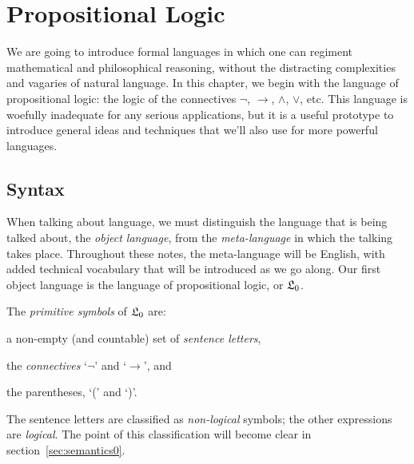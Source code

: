 \chapter{Propositional Logic}\label{ch:propcal}


We are going to introduce formal languages
in which one can regiment mathematical and philosophical reasoning,
without the distracting complexities and vagaries of natural language.
In this chapter,
we begin with the language of propositional logic:
the logic of the connectives $\neg$, $\to$, $\land$, $\lor$, etc.
This language is woefully inadequate for any serious applications,
but it is a useful prototype to introduce general ideas and techniques
that we'll also use for more powerful languages.


\section{Syntax}

When talking about language,
we must distinguish the language that is being talked about,
the \emph{object language},
from the \emph{meta-language} in which the talking takes place.
Throughout these notes,
the meta-language will be English,
with added technical vocabulary that will be introduced as we go along.
Our first object language is the language of propositional logic,
or $\mathfrak{L}_{0}$.

The \emph{primitive symbols} of $\mathfrak{L}_{0}$ are:
%
\begin{itemize*}
\item a non-empty (and countable) set of \textit{sentence letters},
\item the \textit{connectives} `$\neg$' and `$\to$', and
\item the parentheses, `(' and `)'.
\end{itemize*}

The sentence letters are classified as \emph{non-logical} symbols;
the other expressions are \emph{logical}.
The point of this classification will become clear in section~\ref{sec:semantics0}.

